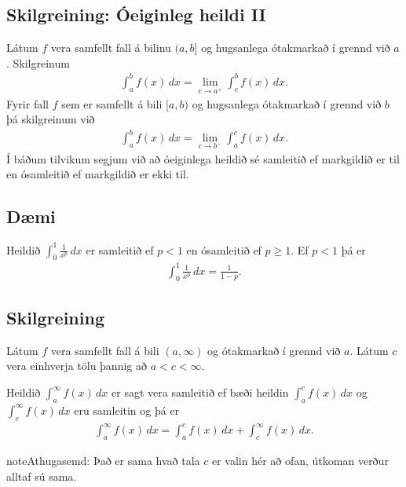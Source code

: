 \documentclass[b5paper,10pt,icelandic]{sphinxmanual}
\begin{document}
\subsection{Skilgreining: Óeiginleg heildi II}
\label{\detokenize{kafli06:skilgreining-oeiginleg-heildi-ii}}
Látum \(f\) vera samfellt fall á bilinu \((a, b]\) og hugsanlega
ótakmarkað í grennd við \(a\). Skilgreinum
\begin{equation*}
\begin{split}\int_a^b f(x)\,dx=\lim_{c\rightarrow a^+} \int_c^b f(x)\,dx.\end{split}
\end{equation*}
Fyrir fall \(f\) sem er samfellt á bili \([a, b)\) og hugsanlega
ótakmarkað í grennd við \(b\) þá skilgreinum við
\begin{equation*}
\begin{split}\int_a^b f(x)\,dx=\lim_{c\rightarrow b^-} \int_a^c f(x)\,dx.\end{split}
\end{equation*}
Í báðum tilvikum segjum við að óeiginlega heildið sé samleitið ef
markgildið er til en ósamleitið ef markgildið er ekki til.


\subsection{Dæmi}
\label{\detokenize{kafli06:id9}}
Heildið \(\int_0^1 \frac{1}{x^p}\,dx\) er samleitið ef \(p<1\)
en ósamleitið ef \(p\geq 1\). Ef \(p<1\) þá er
\begin{equation*}
\begin{split}\int_0^1
\frac{1}{x^p}\,dx=\frac{1}{1-p}.\end{split}
\end{equation*}

\subsection{Skilgreining}
\label{\detokenize{kafli06:id10}}
Látum \(f\) vera samfellt fall á bili \((a,\infty)\) og
ótakmarkað í grennd við \(a\). Látum \(c\) vera einhverja tölu
þannig að \(a<c<\infty\).

Heildið \(\int_a^\infty f(x)\,dx\) er sagt vera samleitið ef bæði
heildin \(\int_a^c f(x)\,dx\) og \(\int_c^\infty f(x)\,dx\) eru
samleitin og þá er
\begin{equation*}
\begin{split}\int_{a}^\infty f(x)\,dx=\int_{a}^c f(x)\,dx + \int_c^\infty f(x)\,dx.\end{split}
\end{equation*}
\begin{sphinxadmonition}{note}{Athugasemd:}
Það er sama hvað tala \(c\) er valin hér að ofan, útkoman verður
alltaf sú sama.
\end{sphinxadmonition}
\end{document}
